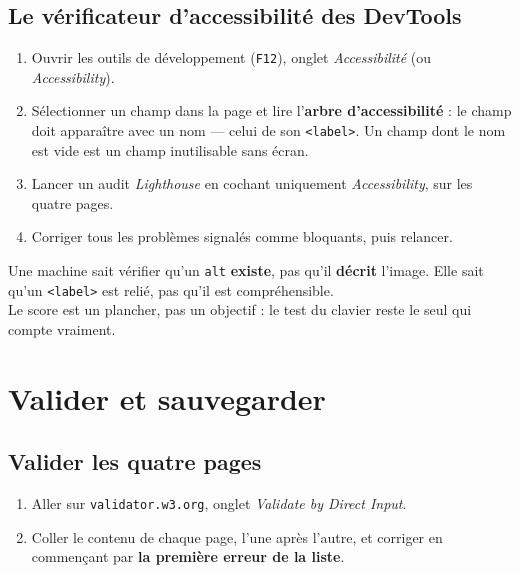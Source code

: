 \documentclass[a4paper,11pt]{article}
\begin{document}
\subsection{Le vérificateur d'accessibilité des DevTools}

\begin{enumerate}
  \item Ouvrir les outils de développement (\texttt{F12}), onglet \textit{Accessibilité} (ou \textit{Accessibility}).
  \item Sélectionner un champ dans la page et lire l'\textbf{arbre d'accessibilité} : le champ doit apparaître avec un nom --- celui de son \texttt{<label>}. Un champ dont le nom est vide est un champ inutilisable sans écran.
  \item Lancer un audit \textit{Lighthouse} en cochant uniquement \textit{Accessibility}, sur les quatre pages.
  \item Corriger tous les problèmes signalés comme bloquants, puis relancer.
\end{enumerate}

\begin{tcolorbox}[attention, title={Un score de 100 ne prouve rien}]
Une machine sait vérifier qu'un \texttt{alt} \textbf{existe}, pas qu'il \textbf{décrit} l'image. Elle sait qu'un \texttt{<label>} est relié, pas qu'il est compréhensible.\\[4pt]
Le score est un plancher, pas un objectif : le test du clavier reste le seul qui compte vraiment.
\end{tcolorbox}

\section{Valider et sauvegarder}

\subsection{Valider les quatre pages}

\begin{enumerate}
  \item Aller sur \texttt{validator.w3.org}, onglet \textit{Validate by Direct Input}.
  \item Coller le contenu de chaque page, l'une après l'autre, et corriger en commençant par \textbf{la première erreur de la liste}.
\end{enumerate}
\end{document}
